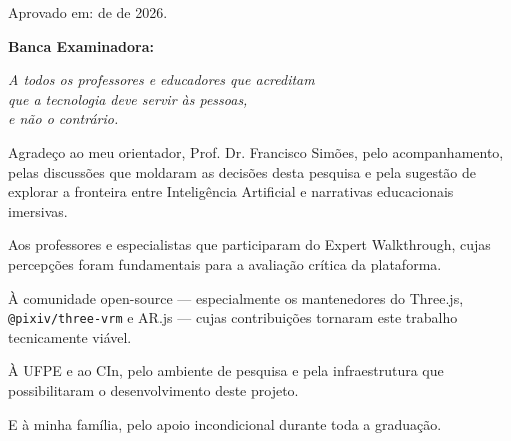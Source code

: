 \documentclass[
  12pt,
  openright,
  twoside,
  a4paper,
  english,
  brazil
]{abntex2}
\begin{document}
\begin{folhadeaprovacao}
  \begin{center}
    {\ABNTEXchapterfont\large\imprimirautor}
    \vspace*{\fill}\vspace*{\fill}
    \begin{center}
      \ABNTEXchapterfont\bfseries\Large\imprimirtitulo
    \end{center}
    \vspace*{\fill}
    \hspace{.45\textwidth}
    \begin{minipage}{.5\textwidth}
      \imprimirpreambulo
    \end{minipage}%
    \vspace*{\fill}
  \end{center}

  Aprovado em: \underline{\hspace{3cm}} de \underline{\hspace{3cm}} de 2026.

  \vspace{1cm}
  \noindent\textbf{Banca Examinadora:}

\end{folhadeaprovacao}

\begin{dedicatoria}
  \vspace*{\fill}
  \centering
  \noindent
  \textit{A todos os professores e educadores que acreditam\\
  que a tecnologia deve servir às pessoas,\\
  e não o contrário.}
  \vspace*{\fill}
\end{dedicatoria}

\begin{agradecimentos}
  Agradeço ao meu orientador, Prof. Dr. Francisco Simões, pelo acompanhamento, pelas
  discussões que moldaram as decisões desta pesquisa e pela
  sugestão de explorar a fronteira entre Inteligência Artificial e narrativas
  educacionais imersivas.

  Aos professores e especialistas que participaram do Expert Walkthrough,
  cujas percepções foram fundamentais para a avaliação crítica da plataforma.

  À comunidade open-source — especialmente os mantenedores do Three.js,
  \texttt{@pixiv/three-vrm} e AR.js — cujas contribuições tornaram este
  trabalho tecnicamente viável.

  À UFPE e ao CIn, pelo ambiente de pesquisa e pela infraestrutura que
  possibilitaram o desenvolvimento deste projeto.

  E à minha família, pelo apoio incondicional durante toda a graduação.
\end{agradecimentos}
\end{document}
